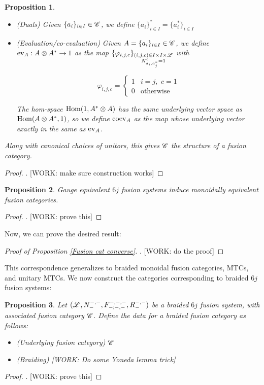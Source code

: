 \documentclass{article}
\newtheorem{proposition}{Proposition}[section]
\theoremstyle{definition}
\numberwithin{figure}{section}
\begin{document}
\begin{proposition}
\begin{itemize}
\item (Duals) Given $\{a_{i}\}_{i\in I}\in \mathscr{C}$, we define $\{a_{i}\}^{*}_{i\in I}=\{a_{i}^{*}\}_{i\in I}$

\item (Evaluation/co-evaluation) Given $A=\{a_{i}\}_{i\in I}\in \mathscr{C}$, we define $\mathrm{ev}_{A}:A\otimes A^{*}\to 1$ as the map $\{\varphi_{i,j,c}\}_{\substack{(i,j,c)\in I\times I \times \mathscr{L} \\ N^{c}_{a_i,a^{*}_j}=1}}$ with

$$\varphi_{i,j,c}=
\begin{cases}
1 & i=j, \,\, c=1\\
0 & \text{otherwise}
\end{cases}$$

The hom-space $\mathrm{Hom}(1, A^{*}\otimes A)$ has the same underlying vector space as $\mathrm{Hom}(A\otimes A^{*},1)$, so we define $\mathrm{coev}_{A}$ as the map whose underlying vector exactly in the same as $\mathrm{ev}_{A}$.
\end{itemize}

Along with canonical choices of unitors, this gives $\mathscr{C}$ the structure of a fusion category.
\end{proposition}
\begin{proof}. [WORK: make sure construction works]
\end{proof}

\begin{proposition} Gauge equivalent $6j$ fusion systems induce monoidally equivalent fusion categories.
\end{proposition}
\begin{proof}. [WORK: prove this]
\end{proof}

Now, we can prove the desired result:

\begin{proof}[Proof of Proposition \ref{Fusion cat converse}]. [WORK: do the proof]
\end{proof}


This correspondence generalizes to braided monoidal fusion categories, MTCs, and unitary MTCs. We now construct the categories corresponding to braided $6j$ fusion systems:

\begin{proposition} Let $(\mathscr{L},N^{\--,\--}_{\--},F^{\--,\--,\--}_{\--;\--,\--},R^{\--,\--}_{\--})$ be a braided $6j$ fusion system, with associated fusion category $\mathscr{C}$. Define the data for a braided fusion category as follows:

\begin{itemize}
\item (Underlying fusion category) $\mathscr{C}$
\item (Braiding) [WORK: Do some Yoneda lemma trick]
\end{itemize}
\end{proposition}
\begin{proof}. [WORK: prove this]
\end{proof}
\end{document}
